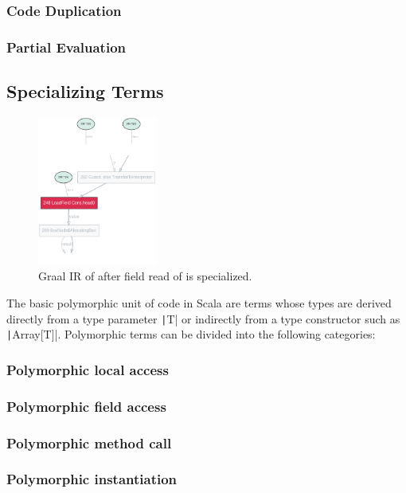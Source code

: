 \subsubsection*{Code Duplication}

\subsubsection*{Partial Evaluation}

\subsection{Specializing Terms}

\begin{figure}[H]
	\centering
	\includegraphics[width=0.35\textwidth]{figures/dot/List.head.TruffleTier.png}
	\caption{Graal IR of  after field read of  is specialized.}
\end{figure}

The basic polymorphic unit of code in Scala are terms whose types are derived directly from a type parameter \texttt|T| or indirectly from a type constructor such as \texttt|Array[T]|.
Polymorphic terms can be divided into the following categories:

\subsubsection*{Polymorphic local access}
\subsubsection*{Polymorphic field access}
\subsubsection*{Polymorphic method call}
\subsubsection*{Polymorphic instantiation}

